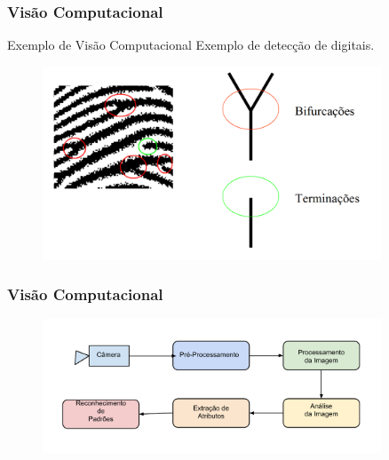 \documentclass{beamer}
\begin{document}

\begin{frame}
\frametitle{Visão Computacional}
	\begin{block}{Exemplo de Visão Computacional}
		Exemplo de detecção de digitais.
	\end{block}
	\begin{figure}[!h]
		\begin{center}
			\includegraphics[width=0.9\textwidth]{Figures/bifdigitais}
		\end{center}
		
	\end{figure}
	
\end{frame}



\begin{frame}
\frametitle{Visão Computacional}

	\begin{figure}[!h]
		\begin{center}
			\includegraphics[width=0.9\textwidth]{Figures/ProcessosVC}
		\end{center}
		
	\end{figure}
	
\end{frame}
\end{document}
